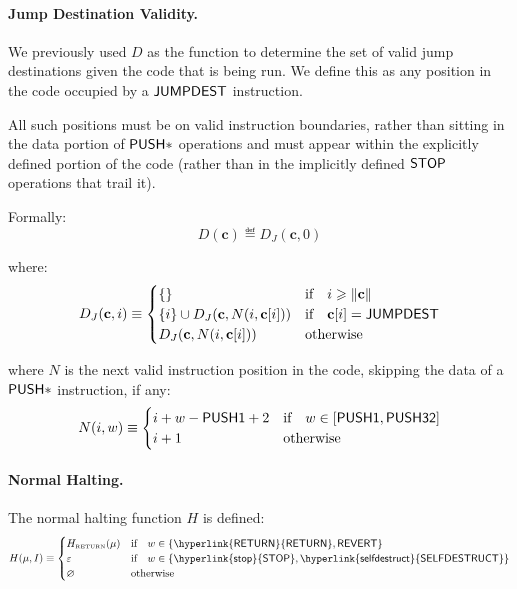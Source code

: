 \paragraph{Jump Destination Validity.}
We previously used $D$ as the function to determine the set of valid jump destinations given the code that is being run. We define this as any position in the code occupied by a  $\mathsf{JUMPDEST}$ instruction.

All such positions must be on valid instruction boundaries, rather than sitting in the data portion of  $\mathsf{PUSH*}$ operations and must appear within the explicitly defined portion of the code (rather than in the implicitly defined \hyperlink{stop}{$\mathsf{STOP}$} operations that trail it).

Formally:
\begin{equation}
D(\mathbf{c}) \eqdef D_{J}(\mathbf{c}, 0)
\end{equation}

where:
\begin{equation}
D_{J}(\mathbf{c}, i) \equiv \begin{cases}
\{\} & \text{if} \quad i \geqslant \lVert \mathbf{c} \rVert  \\
\{ i \} \cup D_{J}(\mathbf{c}, N(i, \mathbf{c}[i])) & \text{if} \quad \mathbf{c}[i] =  \mathsf{JUMPDEST} \\
D_{J}(\mathbf{c}, N(i, \mathbf{c}[i])) & \text{otherwise} \\
\end{cases}
\end{equation}

where $N$ is the next valid instruction position in the code, skipping the data of a  $\mathsf{PUSH*}$ instruction, if any:
\begin{equation}\label{eq:next-instruction}
N(i, w) \equiv \begin{cases}
i + w -  \mathsf{PUSH1} + 2 & \text{if} \quad w \in [ \mathsf{PUSH1},  \mathsf{PUSH32}] \\
i + 1 & \text{otherwise} \end{cases}
\end{equation}

\paragraph{Normal Halting.}\hypertarget{normal_halting_function_H}{}

The normal halting function $H$ is defined:
\begin{equation}
H(\mst, I) \eqdef 
	\begin{cases}
	H_{\text{\tiny RETURN}}(\mst) & \text{if} \quad w \in \{ \op{\hyperlink{RETURN}{RETURN}},  \op{REVERT}\} \\
	\emptystring \quad\quad& \text{if} \quad w \in \{  \op{\hyperlink{stop}{STOP}},  \op{\hyperlink{selfdestruct}{SELFDESTRUCT}} \} \\
	\varnothing \quad\quad& \text{otherwise}
	\end{cases}
\end{equation}

